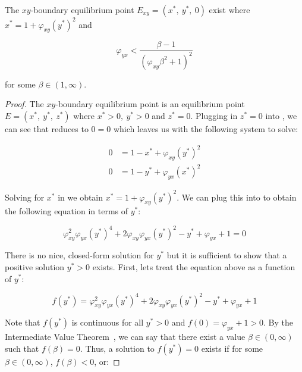 \begin{theorem}\label{thm:eq-boundary-xy-exist}
    The $xy$-boundary equilibrium point $E_{xy}=\left(x^*,\ y^*,\ 0\right)$ exist where $x^*=1+\varphi_{xy}\left(y^*\right)^2$ and 
    
    \begin{equation*}
        \varphi_{yx}<\frac{\beta-1}{\left(\varphi_{xy}\beta^2+1\right)^2}
    \end{equation*}
    
    for some $\beta\in\left(1, \infty\right)$.
\end{theorem}
\begin{proof}
    The $xy$-boundary equilibrium point is an equilibrium point $E=\left(x^*,\ y^*,\ z^*\right)$ where $x^*>0,\ y^*>0$ and $z^*=0$. Plugging in $z^*=0$ into , we can see that  reduces to $0=0$ which leaves us with the following system to solve:

    \begin{subequations}\label{system:xy-boundary}
        \begin{align}
            0 &= 1-x^*+\varphi_{xy}\left(y^*\right)^2 \label{eq:xy-boundary-x}\\
            0 &= 1-y^*+\varphi_{yx}\left(x^*\right)^2 \label{eq:xy-boundary-y}
        \end{align}
    \end{subequations}

    Solving for $x^*$ in  we obtain $x^*=1+\varphi_{xy}\left(y^*\right)^2$. We can plug this into  to obtain the following equation in terms of $y^*$:

    \begin{equation*}
        \varphi_{xy}^2\varphi_{yx}\left(y^*\right)^4+2\varphi_{xy}\varphi_{yx}\left(y^*\right)^2-y^*+\varphi_{yx}+1=0
    \end{equation*}

    There is no nice, closed-form solution for $y^*$ but it is sufficient to show that a positive solution $y^*>0$ exists. First, lets treat the equation above as a function of $y^*$:

    \begin{equation*}
        f\left(y^*\right)=\varphi_{xy}^2\varphi_{yx}\left(y^*\right)^4+2\varphi_{xy}\varphi_{yx}\left(y^*\right)^2-y^*+\varphi_{yx}+1
    \end{equation*}

    Note that $f\left(y^*\right)$ is continuous for all $y^*>0$ and $f(0)=\varphi_{yx}+1>0$. By the Intermediate Value Theorem~\cite{STEWART9781337613927}, we can say that there exist a value $\beta\in\left(0,\infty\right)$ such that $f(\beta)=0$. Thus, a solution to $f\left(y^*\right)=0$ exists if for some $\beta\in\left(0,\infty\right)$, $f\left(\beta\right)<0$, or:


\end{proof}
